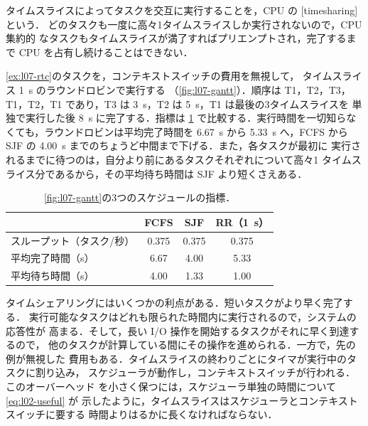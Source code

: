 \documentclass[../main.tex]{subfiles}
\begin{document}
\begin{definition}[タイムシェアリング]
  タイムスライスによってタスクを交互に実行することを，CPU の
  [timesharing]という．
  どのタスクも一度に高々1タイムスライスしか実行されないので，CPU 集約的
  なタスクもタイムスライスが満了すればプリエンプトされ，完了するまで CPU
  を占有し続けることはできない．
\end{definition}

\begin{example}
  \cref{ex:l07-rtc}のタスクを，コンテキストスイッチの費用を無視して，
  タイムスライス \SI{1}{\second} のラウンドロビンで実行する
  （\cref{fig:l07-gantt}）．順序は T1，T2，T3，T1，T2，T1 であり，T3 は
  \SI{3}{\second}，T2 は \SI{5}{\second}，T1 は最後の3タイムスライスを
  単独で実行した後 \SI{8}{\second} に完了する．指標は \cref{tab:l07-rr}
  で比較する．実行時間を一切知らなくても，ラウンドロビンは平均完了時間を
  \SI{6.67}{\second} から \SI{5.33}{\second} へ，FCFS から SJF の
  \SI{4.00}{\second} までのちょうど中間まで下げる．また，各タスクが最初に
  実行されるまでに待つのは，自分より前にあるタスクそれぞれについて高々1
  タイムスライス分であるから，その平均待ち時間は SJF より短くさえある．
\end{example}

\begin{table}[htbp]
  \centering
  \caption{\cref{fig:l07-gantt}の3つのスケジュールの指標．}
  \label{tab:l07-rr}
  \small
  \begin{tabular}{@{}lccc@{}}
    \toprule
    & FCFS & SJF & RR（\SI{1}{\second}） \\
    \midrule
    スループット（タスク/秒） & 0.375 & 0.375 & 0.375 \\
    平均完了時間（s） & 6.67 & 4.00 & 5.33 \\
    平均待ち時間（s） & 4.00 & 1.33 & 1.00 \\
    \bottomrule
  \end{tabular}
\end{table}

タイムシェアリングにはいくつかの利点がある．短いタスクがより早く完了する．
実行可能なタスクはどれも限られた時間内に実行されるので，システムの応答性が
高まる．そして，長い I/O 操作を開始するタスクがそれに早く到達するので，
他のタスクが計算している間にその操作を進められる．一方で，先の例が無視した
費用もある．タイムスライスの終わりごとにタイマが実行中のタスクに割り込み，
スケジューラが動作し，コンテキストスイッチが行われる．このオーバーヘッド
を小さく保つには，スケジューラ単独の時間について \cref{eq:l02-useful} が
示したように，タイムスライスはスケジューラとコンテキストスイッチに要する
時間よりはるかに長くなければならない．
\end{document}
